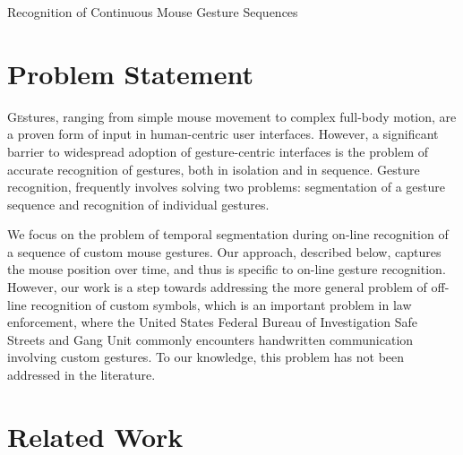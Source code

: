 \documentclass[twoside]{article}
\begin{document}
\centerline{Recognition of Continuous Mouse Gesture Sequences}
\normalsize


\begin{multicols}{2} %

\section{Problem Statement}

\lettrine[nindent=0em,lines=2]{G}estures, ranging from simple mouse movement to
complex full-body motion, are a proven form of input in human-centric user
interfaces\cite{mitra_gesture_2007}. However, a significant barrier to
widespread adoption of gesture-centric interfaces is the problem of accurate
recognition of gestures, both in isolation and in sequence. Gesture recognition,
frequently involves solving two problems: segmentation of a gesture sequence and
recognition of individual gestures.

We focus on the problem of temporal segmentation during on-line recognition of a
sequence of custom mouse gestures. Our approach, described below, captures the
mouse position over time, and thus is specific to on-line gesture recognition.
However, our work is a step towards addressing the more general problem of
off-line recognition of custom symbols, which is an important problem in law
enforcement, where the United States Federal Bureau of Investigation Safe
Streets and Gang Unit commonly encounters handwritten communication involving
custom gestures\cite{lyddane_donald_united_2006}. To our knowledge, this problem
has not been addressed in the literature.

\section{Related Work}


\end{multicols}
\end{document}
